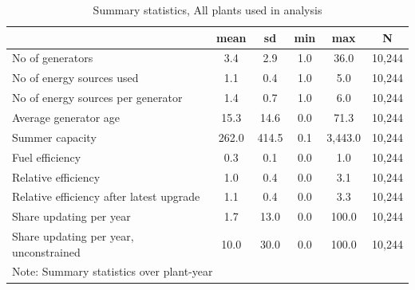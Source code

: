 \begin{table}[htbp]\centering
\footnotesize
\def\sym#1{\ifmmode^{#1}\else\(^{#1}\)\fi}
\caption{Summary statistics, All plants used in analysis}
\begin{tabular}{l*{1}{ccccc}}
\hline\hline
                    &        mean&          sd&         min&         max&           N\\
\hline
No of generators    &         3.4&         2.9&         1.0&        36.0&      10,244\\
No of energy sources used&         1.1&         0.4&         1.0&         5.0&      10,244\\
No of energy sources per generator&         1.4&         0.7&         1.0&         6.0&      10,244\\
Average generator age&        15.3&        14.6&         0.0&        71.3&      10,244\\
Summer capacity     &       262.0&       414.5&         0.1&     3,443.0&      10,244\\
Fuel efficiency     &         0.3&         0.1&         0.0&         1.0&      10,244\\
Relative efficiency &         1.0&         0.4&         0.0&         3.1&      10,244\\
Relative efficiency after latest upgrade&         1.1&         0.4&         0.0&         3.3&      10,244\\
Share updating per year&         1.7&        13.0&         0.0&       100.0&      10,244\\
Share updating per year, unconstrained&        10.0&        30.0&         0.0&       100.0&      10,244\\
\hline\hline
\multicolumn{6}{l}{\footnotesize Note: Summary statistics over plant-year}\\
\end{tabular}
\end{table}
